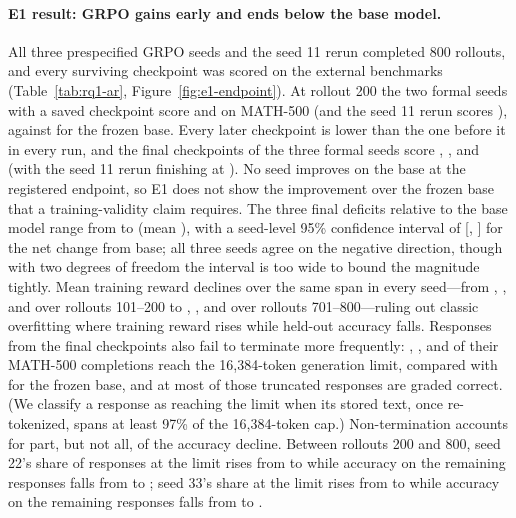 \documentclass[10pt]{article}
\begin{document}
\paragraph{E1 result: GRPO gains early and ends below the base model.}
All three prespecified GRPO seeds and the seed 11 rerun completed 800 rollouts, and every surviving checkpoint was scored on the external benchmarks (Table~\ref{tab:rq1-ar}, Figure~\ref{fig:e1-endpoint}).
At rollout 200 the two formal seeds with a saved checkpoint score \EOneMathGRPOEarlyTwentyTwo{} and \EOneMathGRPOEarlyThirtyThree{} on MATH-500 (and the seed 11 rerun scores \EOneMathGRPORerunEarly{}), against \EOneMathBase{} for the frozen base.
Every later checkpoint is lower than the one before it in every run, and the final checkpoints of the three formal seeds score \EOneMathGRPOEndEleven{}, \EOneMathGRPOEndTwentyTwo{}, and \EOneMathGRPOEndThirtyThree{} (with the seed 11 rerun finishing at \EOneMathGRPORerunEnd{}).
No seed improves on the base at the registered endpoint, so E1 does not show the improvement over the frozen base that a training-validity claim requires.
The three final deficits relative to the base model range from \EOneMathGRPODeficitMin{} to \EOneMathGRPODeficitMax{} (mean \EOneMathGRPODeficitMean{}), with a seed-level 95\% confidence interval of [\EOneMathGRPOChangeLow{}, \EOneMathGRPOChangeHigh{}] for the net change from base; all three seeds agree on the negative direction, though with two degrees of freedom the interval is too wide to bound the magnitude tightly.
Mean training reward declines over the same span in every seed---from \EOneRewardEarlyEleven{}, \EOneRewardEarlyTwentyTwo{}, and \EOneRewardEarlyThirtyThree{} over rollouts 101--200 to \EOneRewardLateEleven{}, \EOneRewardLateTwentyTwo{}, and \EOneRewardLateThirtyThree{} over rollouts 701--800---ruling out classic overfitting where training reward rises while held-out accuracy falls.
Responses from the final checkpoints also fail to terminate more frequently: \EOneLimitGRPOEleven{}, \EOneLimitGRPOTwentyTwo{}, and \EOneLimitGRPOThirtyThree{} of their MATH-500 completions reach the 16,384-token generation limit, compared with \EOneLimitBase{} for the frozen base, and at most \EOneLimitCorrectGRPOMax{} of those truncated responses are graded correct.
(We classify a response as reaching the limit when its stored text, once re-tokenized, spans at least 97\% of the 16,384-token cap.)
Non-termination accounts for part, but not all, of the accuracy decline.
Between rollouts 200 and 800, seed 22's share of responses at the limit rises from \EOneLimitGRPOTwentyTwoEarly{} to \EOneLimitGRPOTwentyTwo{} while accuracy on the remaining responses falls from \EOneRestGRPOTwentyTwoEarly{} to \EOneRestGRPOTwentyTwoEnd{}; seed 33's share at the limit rises from \EOneLimitGRPOThirtyThreeEarly{} to \EOneLimitGRPOThirtyThree{} while accuracy on the remaining responses falls from \EOneRestGRPOThirtyThreeEarly{} to \EOneRestGRPOThirtyThreeEnd{}.
\end{document}
